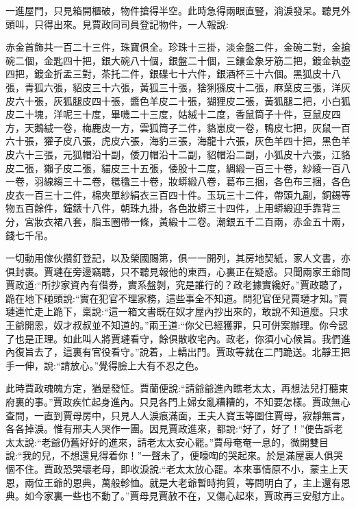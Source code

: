 \begin{parag}
    一進屋門，只見箱開櫃破，物件搶得半空。此時急得兩眼直豎，淌淚發呆。聽見外頭叫，只得出來。見賈政同司員登記物件，一人報說:
\end{parag}


\begin{qute2sp}
    赤金首飾共一百二十三件，珠寶俱全。珍珠十三掛，淡金盤二件，金碗二對，金搶碗二個，金匙四十把，銀大碗八十個，銀盤二十個，三鑲金象牙筋二把，鍍金執壺四把，鍍金折盂三對，茶托二件，銀碟七十六件，銀酒杯三十六個。黑狐皮十八張，青狐六張，貂皮三十六張，黃狐三十張，猞猁猻皮十二張，麻葉皮三張，洋灰皮六十張，灰狐腿皮四十張，醬色羊皮二十張，猢狸皮二張，黃狐腿二把，小白狐皮二十塊，洋呢三十度，畢嘰二十三度，姑絨十二度，香鼠筒子十件，豆鼠皮四方，天鵝絨一卷，梅鹿皮一方，雲狐筒子二件，貉崽皮一卷，鴨皮七把，灰鼠一百六十張，獾子皮八張，虎皮六張，海豹三張，海龍十六張，灰色羊四十把，黑色羊皮六十三張，元狐帽沿十副，倭刀帽沿十二副，貂帽沿二副，小狐皮十六張，江貉皮二張，獺子皮二張，貓皮三十五張，倭股十二度，綢緞一百三十卷，紗綾一百八一卷，羽線縐三十二卷，氆氌三十卷，妝蟒緞八卷，葛布三捆，各色布三捆，各色皮衣一百三十二件，棉夾單紗絹衣三百四十件。玉玩三十二件，帶頭九副，銅錫等物五百餘件，鐘錶十八件，朝珠九掛，各色妝蟒三十四件，上用蟒緞迎手靠背三分，宮妝衣裙八套，脂玉圈帶一條，黃緞十二卷。潮銀五千二百兩，赤金五十兩，錢七千吊。
\end{qute2sp}


\begin{parag}
    一切動用傢伙攢釘登記，以及榮國賜第，俱一一開列，其房地契紙，家人文書，亦俱封裹。賈璉在旁邊竊聽，只不聽見報他的東西，心裏正在疑惑。只聞兩家王爺問賈政道:“所抄家資內有借券，實系盤剝，究是誰行的？政老據實纔好。”賈政聽了，跪在地下碰頭說:“實在犯官不理家務，這些事全不知道。問犯官侄兒賈璉才知。”賈璉連忙走上跪下，稟說:“這一箱文書既在奴才屋內抄出來的，敢說不知道麼。只求王爺開恩，奴才叔叔並不知道的。”兩王道:“你父已經獲罪，只可併案辦理。你今認了也是正理。如此叫人將賈璉看守，餘俱散收宅內。政老，你須小心候旨。我們進內復旨去了，這裏有官役看守。”說着，上轎出門。賈政等就在二門跪送。北靜王把手一伸，說:“請放心。”覺得臉上大有不忍之色。
\end{parag}


\begin{parag}
    此時賈政魂魄方定，猶是發怔。賈蘭便說:“請爺爺進內瞧老太太，再想法兒打聽東府裏的事。”賈政疾忙起身進內。只見各門上婦女亂糟糟的，不知要怎樣。賈政無心查問，一直到賈母房中，只見人人淚痕滿面，王夫人寶玉等圍住賈母，寂靜無言，各各掉淚。惟有邢夫人哭作一團。因見賈政進來，都說:“好了，好了！”便告訴老太太說:“老爺仍舊好好的進來，請老太太安心罷。”賈母奄奄一息的，微開雙目說:“我的兒，不想還見得着你！”一聲未了，便嚎啕的哭起來。於是滿屋裏人俱哭個不住。賈政恐哭壞老母，即收淚說:“老太太放心罷。本來事情原不小，蒙主上天恩，兩位王爺的恩典，萬般軫恤。就是大老爺暫時拘質，等問明白了，主上還有恩典。如今家裏一些也不動了。”賈母見賈赦不在，又傷心起來，賈政再三安慰方止。
\end{parag}


